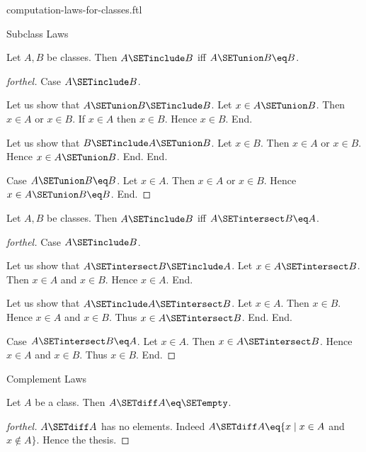 \documentclass{naproche-library}
\begin{document}
\begin{smodule}[title=Computation Laws For Classes]{computation-laws-for-classes.ftl}
\begin{sfragment}{Subclass Laws}
  \begin{proposition}[forthel,id=FOUNDATIONS_02_6657236858306560]
    Let $A, B$ be classes.
    Then $A \SETinclude B$ iff $A \SETunion B \eq B$.
  \end{proposition}
  \begin{proof}[forthel]
    Case $A \SETinclude B$.

      Let us show that $A \SETunion B \SETinclude B$.
        Let $x \in A \SETunion B$.
        Then $x \in A$ or $x \in B$.
        If $x \in A$ then $x \in B$.
        Hence $x \in B$.
      End.

      Let us show that $B \SETinclude A \SETunion B$.
        Let $x \in B$.
        Then $x \in A$ or $x \in B$.
        Hence $x \in A \SETunion B$.
      End.
    End.

    Case $A \SETunion B \eq B$.
      Let $x \in A$.
      Then $x \in A$ or $x \in B$.
      Hence $x \in A \SETunion B \eq B$.
    End.
  \end{proof}

  \begin{proposition}[forthel,id=FOUNDATIONS_02_2356449346846720]
    Let $A, B$ be classes.
    Then $A \SETinclude B$ iff $A \SETintersect B \eq A$.
  \end{proposition}
  \begin{proof}[forthel]
    Case $A \SETinclude B$.

      Let us show that $A \SETintersect B \SETinclude A$.
        Let $x \in A \SETintersect B$.
        Then $x \in A$ and $x \in B$.
        Hence $x \in A$.
      End.

      Let us show that $A \SETinclude A \SETintersect B$.
        Let $x \in A$.
        Then $x \in B$.
        Hence $x \in A$ and $x \in B$.
        Thus $x \in A \SETintersect B$.
      End.
    End.

    Case $A \SETintersect B \eq A$.
      Let $x \in A$.
      Then $x \in A \SETintersect B$.
      Hence $x \in A$ and $x \in B$.
      Thus $x \in B$.
    End.
  \end{proof}
\end{sfragment}

\begin{sfragment}{Complement Laws}
  \begin{proposition}[forthel,id=FOUNDATIONS_02_7433299337150464]
    Let $A$ be a class.
    Then $A \SETdiff A \eq \SETempty$.
  \end{proposition}
  \begin{proof}[forthel]
    $A \SETdiff A$ has no elements.
    Indeed $A \SETdiff A \eq \{ x \mid x \in A$ and $x \notin A \}$.
    Hence the thesis.
  \end{proof}


\end{sfragment}
\end{smodule}
\end{document}
